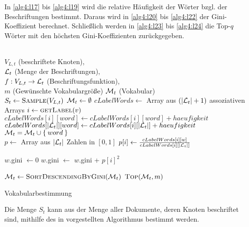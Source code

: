 In \cref{alg4:l17} bis \ref{alg4:l19} wird die relative Häufigkeit
der Wörter bzgl. der Beschriftungen bestimmt. Daraus wird in  
\cref{alg4:l20} bis \ref{alg4:l22} der Gini-Koeffizient berechnet.
Schließlich werden in \cref{alg4:l23} bis \ref{alg4:l24} die Top-$q$
Wörter mit den höchsten Gini-Koeffizienten zurückgegeben.

\begin{algorithm}[ht]
    \begin{algorithmic}[1]
        \Require \\
                 $V_{L,t}$ (beschriftete Knoten),\\
                 $\mathcal{L}_t$ (Menge der Beschriftungen),\\
                 $f:V_{L,t} \rightarrow \mathcal{L}_t$ (Beschriftungsfunktion),\\
                 $m$ (Gewünschte Vokabulargröße)
        \Ensure  $\mathcal{M}_t$ (Vokabular)\\
        \State $S_t \gets \Call{Sample}{V_{L,t}}$\label{alg4:l6} 
        \State $\mathcal{M}_t \gets \emptyset$ 
        \State $cLabelWords \gets$ Array aus $(|\mathcal{L}_t|+1)$ assoziativen Arrays\label{alg4:l8}
         \label{alg4:l10}
            \State $i \gets \Call{getLabel}{v}$
                \State $cLabelWords[i][word] \gets cLabelWords[i][word] + haeufigkeit$
                \State $cLabelWords[|\mathcal{L}_t|][word] \gets cLabelWords[i][|\mathcal{L}_t|] + haeufigkeit$
                \State $\mathcal{M}_t = \mathcal{M}_t \cup \Set{word}$
            \EndFor
        \EndFor\label{alg4:l12}
		\\
            \State $p \gets $ Array aus $|\mathcal{L}_t|$ Zahlen in $[0, 1]$\label{alg4:l17}
                \State $p[i] \gets \frac{cLabelWords[i][w]}{cLabelWords[i][|\mathcal{L}_t|]}$
            \EndFor\label{alg4:l19}

            \State $w$.gini $\gets 0$ \label{alg4:l20}
                \State $w$.gini $\gets$ $w$.gini + $p[i]^2$
            \EndFor\label{alg4:l22}
        \EndFor

        \State $\M_t \gets \Call{SortDescendingByGini}{\M_t}$\label{alg4:l23}
        \State \Return $\Call{Top}{\M_t, m}$\label{alg4:l24}
    \end{algorithmic}
\caption{Vokabularbestimmung}
\label{alg:vokabularbestimmung}
\end{algorithm}

Die Menge $S_t$ kann aus der Menge aller Dokumente, deren 
Knoten beschriftet sind, mithilfe des in \cite{Vitter} vorgestellten
Algorithmus bestimmt werden.
